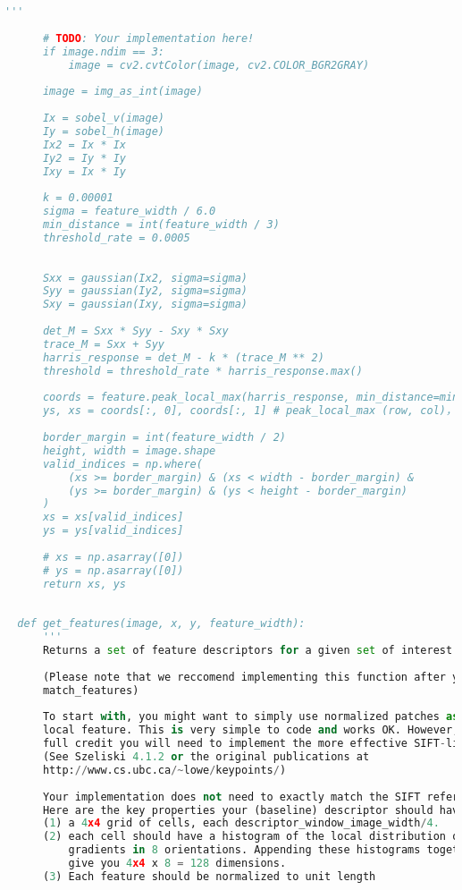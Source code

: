 \begin{lstlisting}[caption={student.py}, label={lst:code-example}, captionpos=t, language=python]
      '''
  
      # TODO: Your implementation here!
      if image.ndim == 3:
          image = cv2.cvtColor(image, cv2.COLOR_BGR2GRAY)
  
      image = img_as_int(image)
  
      Ix = sobel_v(image)
      Iy = sobel_h(image)
      Ix2 = Ix * Ix
      Iy2 = Iy * Iy
      Ixy = Ix * Iy
      
      k = 0.00001 
      sigma = feature_width / 6.0 
      min_distance = int(feature_width / 3) 
      threshold_rate = 0.0005 
      
  
      Sxx = gaussian(Ix2, sigma=sigma)
      Syy = gaussian(Iy2, sigma=sigma)
      Sxy = gaussian(Ixy, sigma=sigma)
  
      det_M = Sxx * Syy - Sxy * Sxy
      trace_M = Sxx + Syy
      harris_response = det_M - k * (trace_M ** 2)
      threshold = threshold_rate * harris_response.max()
      
      coords = feature.peak_local_max(harris_response, min_distance=min_distance, threshold_abs=threshold)
      ys, xs = coords[:, 0], coords[:, 1] # peak_local_max (row, col)， (y, x)
  
      border_margin = int(feature_width / 2)
      height, width = image.shape
      valid_indices = np.where(
          (xs >= border_margin) & (xs < width - border_margin) &
          (ys >= border_margin) & (ys < height - border_margin)
      )
      xs = xs[valid_indices]
      ys = ys[valid_indices]
  
      # xs = np.asarray([0])
      # ys = np.asarray([0])
      return xs, ys
  
  
  def get_features(image, x, y, feature_width):
      '''
      Returns a set of feature descriptors for a given set of interest points.
  
      (Please note that we reccomend implementing this function after you have implemented
      match_features)
  
      To start with, you might want to simply use normalized patches as your
      local feature. This is very simple to code and works OK. However, to get
      full credit you will need to implement the more effective SIFT-like descriptor
      (See Szeliski 4.1.2 or the original publications at
      http://www.cs.ubc.ca/~lowe/keypoints/)
  
      Your implementation does not need to exactly match the SIFT reference.
      Here are the key properties your (baseline) descriptor should have:
      (1) a 4x4 grid of cells, each descriptor_window_image_width/4.
      (2) each cell should have a histogram of the local distribution of
          gradients in 8 orientations. Appending these histograms together will
          give you 4x4 x 8 = 128 dimensions.
      (3) Each feature should be normalized to unit length
  

\end{lstlisting}
